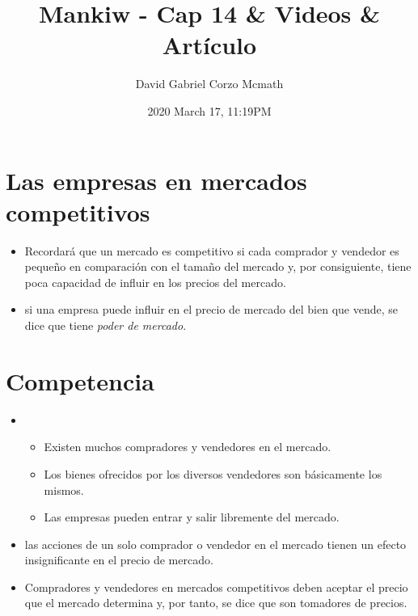 \documentclass{article}
\title{Mankiw - Cap 14 \& Videos \& Artículo}
\date{2020 March 17, 11:19PM}
\author{David Gabriel Corzo Mcmath}
\begin{document}
\maketitle

\section{Las empresas en mercados competitivos}
\begin{itemize}
    \item Recordará que un mercado es competitivo si cada comprador y vendedor es pequeño en comparación con el tamaño del mercado y, por consiguiente, tiene poca capacidad de influir en los precios del mercado.
    \item si una empresa puede influir en el precio de mercado del bien que vende, se dice que tiene \emph{poder de mercado}.
\end{itemize}
\section{Competencia}
\begin{itemize}
    \item {} 
        \begin{itemize}
            \item Existen muchos compradores y vendedores en el mercado.
            \item Los bienes ofrecidos por los diversos vendedores son básicamente los mismos. 
            \item Las empresas pueden entrar y salir libremente del mercado. 
        \end{itemize}
    
    \item las acciones de un solo comprador o vendedor en el mercado tienen un efecto insignificante en el precio de mercado.
    \item Compradores y vendedores en mercados competitivos deben aceptar el precio que el mercado determina y, por tanto, se dice que son tomadores de precios. 
\end{itemize}
\end{document}
